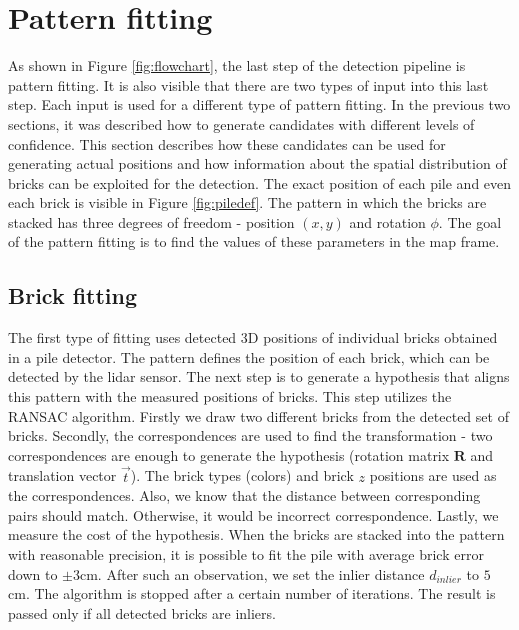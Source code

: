 \section{Pattern fitting}
As shown in Figure \ref{fig:flowchart}, the last step of the detection pipeline is pattern fitting. It is also visible that there are two types of input into this last step. Each input is used for a different type of pattern fitting. In the previous two sections, it was described how to generate candidates with different levels of confidence. This section describes how these candidates can be used for generating actual positions and how information about the spatial distribution of bricks can be exploited for the detection. The exact position of each pile and even each brick is visible in Figure \ref{fig:piledef}. The pattern in which the bricks are stacked has three degrees of freedom - position $(x, y)$ and rotation $\phi$. The goal of the pattern fitting is to find the values of these parameters in the map frame.

\subsection{Brick fitting}
The first type of fitting uses detected 3D positions of individual bricks obtained in a pile detector. The pattern defines the position of each brick, which can be detected by the lidar sensor. The next step is to generate a hypothesis that aligns this pattern with the measured positions of bricks. This step utilizes the RANSAC algorithm. Firstly we draw two different bricks from the detected set of bricks. Secondly, the correspondences are used to find the transformation - two correspondences are enough to generate the hypothesis (rotation matrix $\bm{R}$ and translation vector $\vec{t}$). The brick types (colors) and brick $z$ positions are used as the correspondences. Also, we know that the distance between corresponding pairs should match. Otherwise, it would be incorrect correspondence. Lastly, we measure the cost of the hypothesis. When the bricks are stacked into the pattern with reasonable precision, it is possible to fit the pile with average brick error down to $\pm 3$cm. After such an observation, we set the inlier distance $d_{inlier}$ to $5$cm. The algorithm is stopped after a certain number of iterations. The result is passed only if all detected bricks are inliers.

